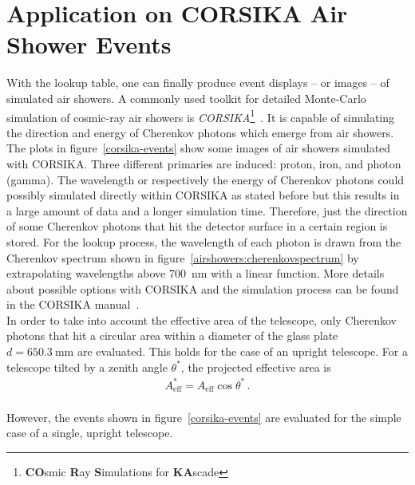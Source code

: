 \section{Application on CORSIKA Air Shower Events}

With the lookup table, one can finally produce event displays -- or images -- of simulated air showers. A commonly used toolkit for detailed Monte-Carlo simulation of cosmic-ray air showers is \textit{CORSIKA}\footnote{\textbf{CO}smic \textbf{R}ay \textbf{S}imulations for \textbf{KA}scade}~\cite{corsika:website}. It is capable of simulating the direction and energy of Cherenkov photons which emerge from air showers.\\

The plots in figure~\ref{corsika-events} show some images of air showers simulated with CORSIKA. Three different primaries are induced: proton, iron, and photon (gamma). The wavelength or respectively the energy of Cherenkov photons could possibly simulated directly within CORSIKA as stated before but this results in a large amount of data and a longer simulation time. Therefore, just the direction of some Cherenkov photons that hit the detector surface in a certain region is stored. For the lookup process, the wavelength of each photon is drawn from the Cherenkov spectrum shown in figure~\ref{airshowers:cherenkovspectrum} by extrapolating wavelengths above \SI{700}{\nano\meter} with a linear function. More details about possible options with CORSIKA and the simulation process can be found in the CORSIKA manual~\cite{corsika:manual}.\\

In order to take into account the effective area of the telescope, only Cherenkov photons that hit a circular area within a diameter of the glass plate $d=\SI{650.3}{\milli\meter}$ are evaluated. This holds for the case of an upright telescope. For a telescope tilted by a zenith angle $\theta^\ast$, the projected effective area is
\begin{align}
A_\text{eff}^\ast = A_\text{eff}\cos{\theta^\ast}\,.
\end{align}\\

However, the events shown in figure~\ref{corsika-events} are evaluated for the simple case of a single, upright telescope.

